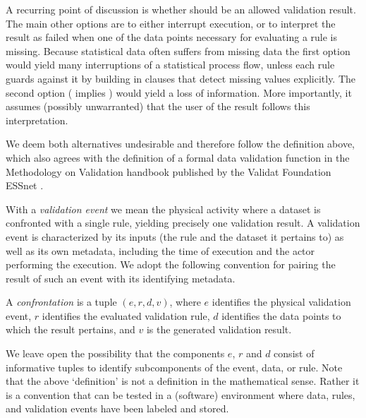 A recurring point of discussion is whether \na{} should be an allowed
validation result. The main other options are to either interrupt execution, or
to interpret the result as failed when one of the data points
necessary for evaluating a rule is missing. Because statistical data often
suffers from missing data the first option would yield many interruptions of a
statistical process flow, unless each rule guards against it by building in
clauses that detect missing values explicitly. The second option (\na{} implies
\onwaar{}) would yield a loss of information. More importantly, it assumes
(possibly unwarranted) that the user of the result follows this interpretation.

We deem both alternatives undesirable and therefore follow the definition
above, which also agrees with the definition of a formal data validation
function in the Methodology on Validation handbook published by the Validat
Foundation ESSnet \citep{zio2015methodology}.



With a \emph{validation event} we mean the physical activity where a dataset is
confronted with a single rule, yielding precisely one validation result. A
validation event is characterized by its inputs (the rule and the dataset it
pertains to) as well as its own metadata, including the time of execution and
the actor performing the execution. We adopt the following convention for
pairing the result of such an event with its identifying metadata.
%
\begin{definition}[confrontation] 
A \emph{confrontation} is a tuple $(e,r,d,v)$, where $e$ identifies the physical
validation event, $r$ identifies the evaluated validation rule, $d$
identifies the data points to which the result pertains, and $v$ is the
generated validation result.
\label{def:confrontation}
\end{definition}
%
We leave open the possibility that the components $e$, $r$ and $d$ consist of
informative tuples to identify subcomponents of the event, data, or rule. Note
that the above `definition' is not a definition in the mathematical sense.
Rather it is a convention that can be tested in a (software) environment where
data, rules, and validation events have been labeled and stored.

